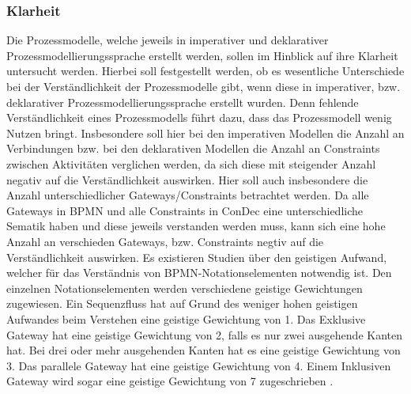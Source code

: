 \subsubsection{Klarheit}
Die Prozessmodelle, welche jeweils in imperativer und deklarativer Prozessmodellierungssprache erstellt werden, sollen im Hinblick auf ihre Klarheit untersucht werden. Hierbei soll festgestellt werden, ob es wesentliche Unterschiede bei der Verständlichkeit der Prozessmodelle gibt, wenn diese in imperativer, bzw. deklarativer Prozessmodellierungssprache erstellt wurden. Denn fehlende Verständlichkeit eines Prozessmodells führt dazu, dass das Prozessmodell wenig Nutzen bringt. Insbesondere soll hier bei den imperativen Modellen die Anzahl an Verbindungen bzw. bei den deklarativen Modellen die Anzahl an Constraints zwischen Aktivitäten verglichen werden, da sich diese mit steigender Anzahl negativ auf die Verständlichkeit auswirken\cite{gruhn2006adopting, thesis_maja,haisjackl2014understanding}.\newline
Hier soll auch insbesondere die Anzahl unterschiedlicher Gateways/Constraints betrachtet werden.  Da alle Gateways in BPMN und alle Constraints in ConDec eine unterschiedliche Sematik haben und diese jeweils verstanden werden muss, kann sich eine hohe Anzahl an verschieden Gateways, bzw. Constraints negtiv auf die Verständlichkeit auswirken. Es existieren Studien über den geistigen Aufwand, welcher für das Verständnis von BPMN-Notationselementen notwendig ist. Den einzelnen Notationselementen werden verschiedene geistige Gewichtungen zugewiesen. Ein Sequenzfluss hat auf Grund des weniger hohen geistigen Aufwandes beim Verstehen eine geistige Gewichtung von 1. Das Exklusive Gateway hat eine geistige Gewichtung von 2, falls es nur zwei ausgehende Kanten hat. Bei drei oder mehr ausgehenden Kanten hat es eine geistige Gewichtung von 3. Das parallele Gateway hat eine geistige Gewichtung von 4. Einem Inklusiven Gateway wird sogar eine geistige Gewichtung von 7 zugeschrieben \cite{gruhn2006adopting, thesis_maja}.\newline

